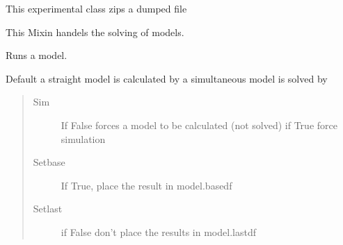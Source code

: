 \documentclass[letterpaper,10pt,english]{sphinxmanual}
\begin{document}

\begin{fulllineitems}
\label{\detokenize{index:modelclass.Zip_Mixin}}
\pysigstartsignatures
{}
\pysigstopsignatures
\sphinxAtStartPar
This experimental class zips a dumped file

\end{fulllineitems}


\begin{fulllineitems}
\label{\detokenize{index:modelclass.Solver_Mixin}}
\pysigstartsignatures
{}
\pysigstopsignatures
\sphinxAtStartPar
This Mixin handels the solving of models.

\begin{fulllineitems}
\label{\detokenize{index:modelclass.Solver_Mixin.__call__}}
\pysigstartsignatures
{}
\pysigstopsignatures
\sphinxAtStartPar
Runs a model.

\sphinxAtStartPar
Default a straight model is calculated by  a simultaneous model is solved by 
\begin{quote}\begin{description}
\item[{Sim}] \leavevmode
\sphinxAtStartPar
If False forces a  model to be calculated (not solved) if True force simulation

\item[{Setbase}] \leavevmode
\sphinxAtStartPar
If True, place the result in model.basedf

\item[{Setlast}] \leavevmode
\sphinxAtStartPar
if False don’t place the results in model.lastdf

\end{description}\end{quote}


\end{fulllineitems}
\end{fulllineitems}
\end{document}
